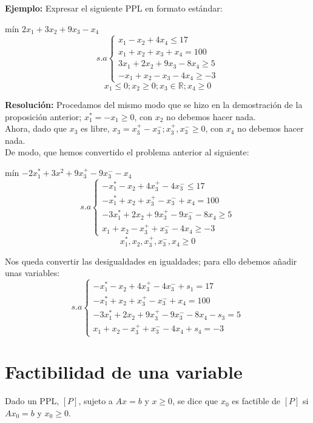 \documentclass[11pt,fleqn]{book} %
\begin{document}
\textbf{Ejemplo: } Expresar el siguiente PPL en formato estándar: \\
\begin{center}
	mín $2x_1+3x_2+9x_3-x_4$
	$$
	s.a\left\lbrace
	\begin{array}{l}
	x_1-x_2+4x_4 \leq 17 \\
	x_1+x_2+x_3+x_4 = 100 \\
	3x_1+2x_2+9x_3-8x_4  \geq 5 \\
	-x_1+x_2-x_3-4x_4 \geq -3
	\end{array}
	\right.
	$$
	$$x_1 \leq 0; x_2 \geq 0; x_3 \in \mathbb{R} ; x_4 \geq 0$$
\end{center}
\textbf{Resolución: } Procedamos del mismo modo que se hizo en la demostración de la proposición anterior;
$x_1^*=-x_1\geq 0$, 
con $x_2$ no debemos hacer nada.\\
Ahora, dado que $x_3$ es libre,
$x_3=x_3^+-x_3^-; x_3^+, x_3^- \geq 0$, con $x_4$ no debemos hacer nada. \\
De modo, que hemos convertido el problema anterior al siguiente: 
\begin{center}
	mín $-2x_1^*+3x^2+9x_3^+-9x_3^--x_4$
	$$s.a\left\lbrace
	\begin{array}{l}
	-x_1^*-x_2+4x_3^+-4x_3^- \leq 17 \\
	-x_1^*+x_2+x_3^+-x_3^-+x_4 = 100 \\
	-3x_1^*+2x_2+9x_3^+-9x_3^--8x_4 \geq 5 \\
	x_1+x_2-x_3^++x_3^--4x_4 \geq -3
	\end{array}
	\right.$$
	$$x_1^*, x_2, x_3^+, x_3^-, x_4 \geq 0$$
\end{center}
Nos queda convertir las desigualdades en igualdades; para ello debemos añadir unas variables:
$$
s.a\left\lbrace
\begin{array}{l}
-x_1^*-x_2+4x_3^+-4x_3^- + s_1= 17 \\
-x_1^*+x_2+x_3^+-x_3^-+x_4 = 100 \\
-3x_1^*+2x_2+9x_3^+-9x_3^--8x_4 -s_3= 5 \\
x_1+x_2-x_3^++x_3^--4x_4 + s_4 =  -3
\end{array}
\right.
$$

\section{Factibilidad de una variable}
\begin{definition}
	Dado un PPL, $[P]$, sujeto a $Ax=b$ y $x\geq 0$, se dice que $x_0$ es factible de $[P]$ si $Ax_0=b$ y $x_0 \geq 0$.
\end{definition}
\end{document}
